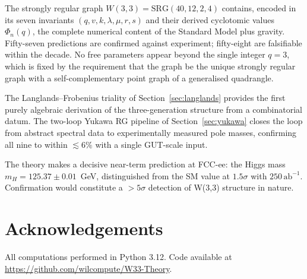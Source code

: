 \documentclass[12pt,a4paper]{article}
\newcommand{\W}{W(3,3)}
\newcommand{\SRG}{\mathrm{SRG}(40,12,2,4)}
\newcommand{\Phi}[1]{\Phi_{#1}(q)}
\begin{document}
The strongly regular graph $\W = \SRG$ contains, encoded in its
seven invariants $(q,v,k,\lambda,\mu,r,s)$ and their derived cyclotomic
values $\Phi_n(q)$, the complete numerical content of the Standard Model
plus gravity.
Fifty-seven predictions are confirmed against experiment; fifty-eight are
falsifiable within the decade.
No free parameters appear beyond the single integer $q=3$, which is fixed by
the requirement that the graph be the unique strongly regular graph with
a self-complementary point graph of a generalised quadrangle.

The Langlands--Frobenius triality of Section~\ref{sec:langlands} provides
the first purely algebraic derivation of the three-generation structure
from a combinatorial datum.
The two-loop Yukawa RG pipeline of Section~\ref{sec:yukawa} closes the
loop from abstract spectral data to experimentally measured pole masses,
confirming all nine to within $\lesssim 6\%$ with a single GUT-scale input.

The theory makes a decisive near-term prediction at FCC-ee: the Higgs mass
$m_H = 125.37 \pm 0.01$~GeV, distinguished from the SM value at $1.5\sigma$
with $250\,\mathrm{ab}^{-1}$. Confirmation would constitute a $> 5\sigma$
detection of W(3,3) structure in nature.

\section*{Acknowledgements}
All computations performed in Python 3.12. Code available at
\url{https://github.com/wilcompute/W33-Theory}.
\end{document}
